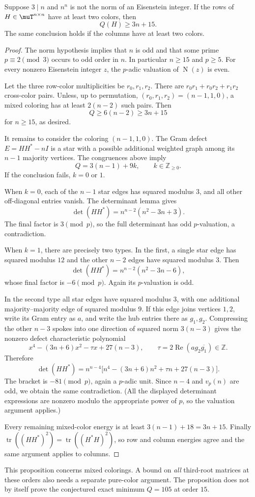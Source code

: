 \begin{proposition}
\label{prop:mixed-inert-prime-gap}
Suppose \(3\mid n\) and \(n^n\) is not the norm of an
Eisenstein integer. If the rows of
\(H\in\muT^{n\times n}\) have at least two colors, then
\[
 \boxed{\quad Q(H)\ge 3n+15.\quad}
\]
The same conclusion holds if the columns have at least two colors.
\end{proposition}
\begin{proof}
The norm hypothesis implies that \(n\) is odd and that some
prime \(p\equiv2\pmod3\) occurs to odd order in \(n\).
In particular \(n\ge15\) and \(p\ge5\).
For every nonzero Eisenstein integer \(z\),
the \(p\)-adic valuation of \(\operatorname N(z)\) is even.

Let the three row-color multiplicities be \(r_0,r_1,r_2\).
There are \(r_0r_1+r_0r_2+r_1r_2\) cross-color pairs.
Unless, up to permutation, \((r_0,r_1,r_2)=(n-1,1,0)\),
a mixed coloring has at least \(2(n-2)\) such pairs.
Then
\[
 Q\ge6(n-2)\ge3n+15
\]
for \(n\ge15\), as desired.

It remains to consider the coloring \((n-1,1,0)\).
The Gram defect \(E=HH^*-nI\) is a star with a possible
additional weighted graph among its \(n-1\) majority
vertices. The congruences above imply
\[
 Q=3(n-1)+9k,\qquad k\in\mathbb Z_{\ge0}.
\]
If the conclusion fails, \(k=0\) or \(1\).

When \(k=0\), each of the \(n-1\) star edges has
squared modulus \(3\), and all other off-diagonal
entries vanish. The determinant lemma gives
\[
 \det(HH^*)=n^{n-2}(n^2-3n+3).
\]
The final factor is \(3\pmod p\), so the full determinant
has odd \(p\)-valuation, a contradiction.

When \(k=1\), there are precisely two types.
In the first, a single star edge has squared modulus \(12\)
and the other \(n-2\) edges have squared modulus \(3\).
Then
\[
 \det(HH^*)=n^{n-2}(n^2-3n-6),
\]
whose final factor is \(-6\pmod p\). Again its
\(p\)-valuation is odd.

In the second type all star edges have squared modulus
\(3\), with one additional majority--majority edge
of squared modulus \(9\). If this edge joins vertices
\(1,2\), write its Gram entry as \(a\), and write the
hub entries there as \(g_1,g_2\). Compressing the other
\(n-3\) spokes into one direction of squared norm
\(3(n-3)\) gives the nonzero defect characteristic
polynomial
\[
 x^4-(3n+6)x^2-\tau x+27(n-3),\qquad
 \tau=2\operatorname{Re}(a g_2\overline{g_1})\in\mathbb Z.
\]
Therefore
\[
 \det(HH^*)=n^{n-4}
 \bigl[n^4-(3n+6)n^2+\tau n+27(n-3)\bigr].
\]
The bracket is \(-81\pmod p\), again a \(p\)-adic unit.
Since \(n-4\) and \(v_p(n)\) are odd, we obtain the
same contradiction. (All the displayed determinant
expressions are nonzero modulo the appropriate power
of \(p\), so the valuation argument applies.)

Every remaining mixed-color energy is at least
\(3(n-1)+18=3n+15\).
Finally \(\operatorname{tr}((HH^*)^2)
=\operatorname{tr}((H^*H)^2)\), so row and column
energies agree and the same argument applies to columns.
\end{proof}

\begin{remark}
This proposition concerns mixed colorings. A bound on
\emph{all} third-root matrices at these orders also needs
a separate pure-color argument. The proposition does not
by itself prove the conjectured exact minimum
\(Q=105\) at order \(15\).
\end{remark}
